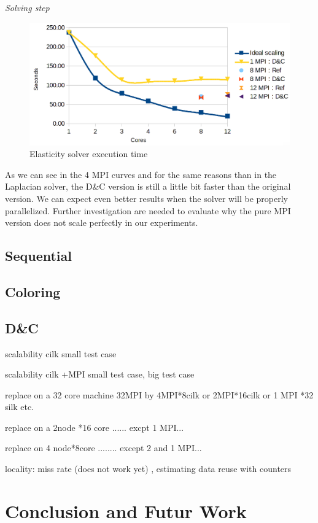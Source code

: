 \documentclass{IOS-Book-Article}
\begin{document}
\emph{Solving step}
\begin{figure}[htp]
 \centering
 \label{fig9}
 \includegraphics[scale=0.2]{Elasticity_solver_time.png}
 \caption{Elasticity solver execution time}
\end{figure}
As we can see in the 4 MPI curves and for the same reasons than in the Laplacian solver, the D\&C version is still a little bit faster than the original version.
We can expect even better results when the solver will be properly parallelized.
Further investigation are needed to evaluate why the pure MPI version does not scale perfectly in our experiments.

\subsection{Sequential}
\subsection{Coloring}
\subsection{D\&C}

scalability cilk small test case

scalability cilk +MPI small test case, big test case


replace on a 32 core machine 32MPI by 4MPI*8cilk or 2MPI*16cilk or 1 MPI *32 silk etc.

replace on a 2node *16 core   ...... excpt 1 MPI...

replace on 4 node*8core ........ except 2 and 1 MPI...


locality: miss rate (does not work yet) , estimating data reuse with counters

\section{Conclusion and Futur Work}
\end{document}
